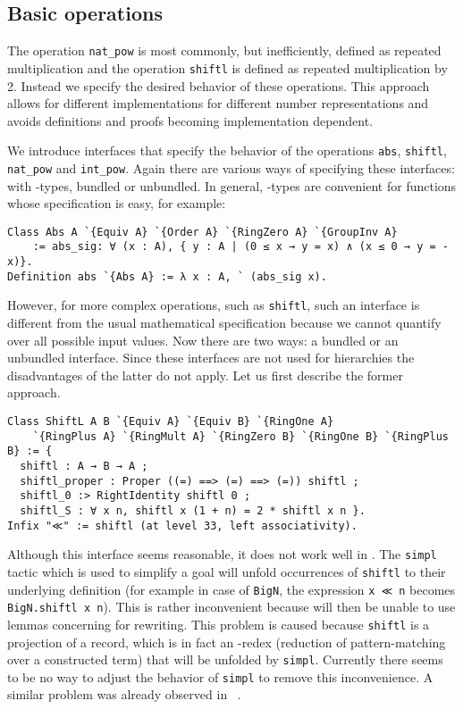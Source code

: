 \documentclass[a4paper,10pt,runningheads]{llncs}
\begin{document}
\subsection{Basic operations}
The operation \lstinline|nat_pow| is most commonly, but inefficiently, defined as repeated multiplication and the operation \lstinline|shiftl| is defined as repeated multiplication by 2. Instead we specify the desired behavior of these operations. This approach allows for different implementations for different number representations and avoids definitions and proofs  becoming implementation dependent.

We introduce interfaces that specify the behavior of the operations \lstinline|abs|, \mbox{\lstinline|shiftl|,} \lstinline|nat_pow| and \lstinline|int_pow|. Again there are various ways of specifying these interfaces: with -types, bundled or unbundled. In general, \mbox{-types} are convenient for functions whose specification is easy, for example:
\begin{lstlisting}
Class Abs A `{Equiv A} `{Order A} `{RingZero A} `{GroupInv A} 
	:= abs_sig: ∀ (x : A), { y : A | (0 ≤ x → y = x) ∧ (x ≤ 0 → y = -x)}.
Definition abs `{Abs A} := λ x : A, ` (abs_sig x).
\end{lstlisting} 
However, for more complex operations, such as \lstinline|shiftl|, such an interface is different from the usual mathematical specification because we cannot quantify over all possible input values. Now there are two ways: a bundled or an unbundled interface. Since these interfaces are not used for hierarchies the disadvantages of the latter do not apply. Let us first describe the former approach.
\begin{lstlisting}
Class ShiftL A B `{Equiv A} `{Equiv B} `{RingOne A} 
	`{RingPlus A} `{RingMult A} `{RingZero B} `{RingOne B} `{RingPlus B} := {
  shiftl : A → B → A ;
  shiftl_proper : Proper ((=) ==> (=) ==> (=)) shiftl ;
  shiftl_0 :> RightIdentity shiftl 0 ;
  shiftl_S : ∀ x n, shiftl x (1 + n) = 2 * shiftl x n }.
Infix "≪" := shiftl (at level 33, left associativity).
\end{lstlisting}
Although this interface seems reasonable, it does not work well in \Coq. The \lstinline|simpl| tactic which is used to simplify a goal will unfold occurrences of \lstinline|shiftl| to their underlying definition (for example in case of \lstinline|BigN|, the expression \lstinline|x ≪ n| becomes \lstinline|BigN.shiftl x n|). This is rather inconvenient because \Coq{} will then be unable to use lemmas concerning  for rewriting. This problem is caused because \lstinline|shiftl| is a projection of a record, which is in fact an -redex (reduction of pattern-matching over a constructed term) that will be unfolded by \lstinline|simpl|. Currently there seems to be no way to adjust the behavior of \lstinline|simpl| to remove this inconvenience. A similar problem was already observed in \Ssreflect~\cite{ssr}.
\end{document}
